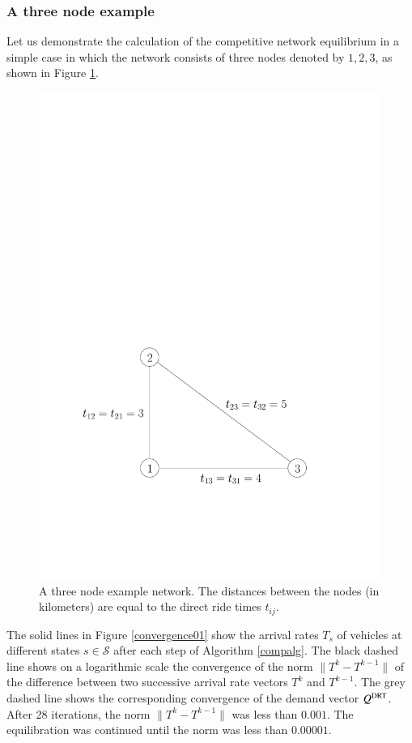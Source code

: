 \documentclass[dissertation,draft*]{aaltoseries}
\begin{document}
\subsubsection{A three node example}
\label{compexample}
Let us demonstrate the calculation of the competitive network equilibrium in a simple case 
in which the network consists of three nodes denoted by $1,2,3$, as shown in Figure \ref{3node01}. 

\begin{figure}[ht]
\begin{center}
\includegraphics[width=0.4\columnwidth]{3node01}
\caption{A three node example network. The distances between the nodes 
(in kilometers) are equal to the direct ride times $t_{ij}$.}
\label{3node01}
\end{center}
\end{figure}

The solid lines in Figure \ref{convergence01} show the
arrival rates $T_s$ of vehicles at different states $s \in \mathcal{S}$ after each step of Algorithm \ref{compalg}. 
The black dashed line shows on a logarithmic scale the convergence of the norm $\|T^k - T^{k-1}\|$ 
of the difference between two successive arrival rate vectors $T^k$ and $T^{k-1}$.
The grey dashed line shows the corresponding convergence of the demand vector $Q^{\rm DRT}$.
After 28 iterations, the norm $\|T^k - T^{k-1}\|$ was less than $0.001$. 
The equilibration was continued until the norm was less than $0.00001$.
\end{document}
